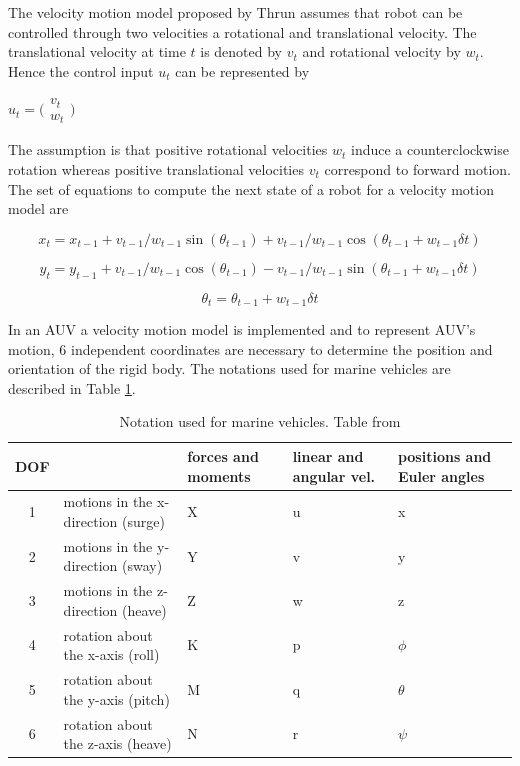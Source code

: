 \documentclass[12pt]{dalcsthesis}
\begin{document}
The velocity motion model proposed by Thrun \cite{thrun2005probabilistic} assumes that robot can be controlled through two velocities a rotational and translational velocity. The translational velocity at time $t$ is denoted by $v_{t}$ and rotational velocity by $w_{t}$. Hence the control input $u_{t}$ can be represented by  
\begin{center}
$u_{t}=\bigl(\begin{array}{c}
                v_{t} \\
                w_{t}
               \end{array}\bigr)$
  
\end{center}

The assumption is that positive rotational velocities $w_{t}$ induce a counterclockwise rotation whereas positive translational velocities $v_{t}$ correspond to forward motion. The set of equations to compute the next state of a robot for a velocity motion model are 

\begin{equation}
x_{t}=x_{t-1}+v_{t-1}/w_{t-1} \sin(\theta_{t-1})+ v_{t-1}/w_{t-1} \cos(\theta_{t-1} + w_{t-1} \delta t)
\end{equation}

\begin{equation}
y_{t}=y_{t-1}+v_{t-1}/w_{t-1} \cos(\theta_{t-1})- v_{t-1}/w_{t-1} \sin(\theta_{t-1} + w_{t-1} \delta t)
\end{equation}

\begin{equation}
\theta_{t}=\theta_{t-1}+ w_{t-1} \delta t
\end{equation}
 


In an AUV a velocity motion model is implemented and to represent AUV's motion, 6 independent coordinates are necessary to determine the position and orientation of the rigid body. The notations used for marine vehicles are described in Table \ref{marine notation}. 

\begin{table}[tbh]
\centering
\label{marine notation}
\begin{tabular}{|c|>{\centering}p{3cm}|>{\centering}p{3cm}|>{\centering}p{3cm}|>{\centering}p{3cm}|}
\hline 
DOF &  & forces and moments & linear and angular vel. & positions and Euler angles\tabularnewline
\hline 
\hline 
1 & motions in the x-direction (surge) & X & u & x\tabularnewline
\hline 
2 & motions in the y-direction (sway) & Y & v & y\tabularnewline
\hline 
3 & motions in the z-direction (heave) & Z & w & z\tabularnewline
\hline 
4 & rotation about the x-axis (roll) & K & p & $\phi$\tabularnewline
\hline 
5 & rotation about the y-axis (pitch) & M & q & $\theta$\tabularnewline
\hline 
6 & rotation about the z-axis (heave) & N & r & $\psi$\tabularnewline
\hline 
\end{tabular}
\caption{Notation used for marine vehicles. Table from \cite{Thor}}
\end{table}
\end{document}
